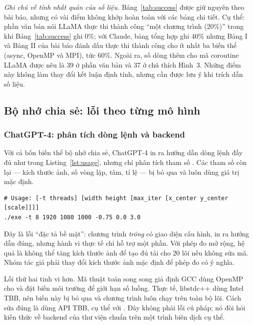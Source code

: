 \noindent\textit{Ghi chú về tính nhất quán của số liệu.} Bảng~\ref{tab:success}
được giữ nguyên theo bài báo, nhưng có vài điểm không khớp hoàn toàn với các bảng
chi tiết. Cụ thể: phần văn bản nói LLaMA thực thi thành công “một chương trình
(20\%)” trong khi Bảng~\ref{tab:success} ghi 0\%; với Claude, bảng tổng hợp ghi
40\% nhưng Bảng I và Bảng II của bài báo đánh dấu thực thi thành công cho ít nhất
ba biến thể (async, OpenMP và MPI), tức 60\%. Ngoài ra, số dòng thêm cho mã
coroutine LLaMA được nêu là 39 ở phần văn bản và 37 ở chú thích Hình~3. Những
điểm này không làm thay đổi kết luận định tính, nhưng cần được lưu ý khi trích
dẫn số liệu.

\subsection{Bộ nhớ chia sẻ: lỗi theo từng mô hình}

\subsubsection{ChatGPT-4: phân tích dòng lệnh và backend}

Với cả bốn biến thể bộ nhớ chia sẻ, ChatGPT-4 in ra hướng dẫn dòng lệnh đầy đủ
như trong Listing~\ref{lst:usage}, nhưng chỉ phân tích tham số . Các
tham số còn lại — kích thước ảnh, số vòng lặp, tâm, tỉ lệ — bị bỏ qua và luôn
dùng giá trị mặc định.

\begin{lstlisting}[language={},caption={Hướng dẫn dòng lệnh do ChatGPT-4 sinh (Listing 1 trong bài báo).},label={lst:usage},numbers=none,basicstyle=\ttfamily\small]
# Usage: [-t threads] [width height [max_iter [x_center y_center [scale]]]]
./exe -t 8 1920 1080 1000 -0.75 0.0 3.0
\end{lstlisting}

Đây là lỗi “đặc tả bề mặt”: chương trình \emph{trông} có giao diện cấu hình, in
ra hướng dẫn đúng, nhưng hành vi thực tế chỉ hỗ trợ một phần. Với phép đo mở rộng,
hệ quả là không thể tăng kích thước ảnh để tạo đủ tải cho 20 lõi nếu không sửa
mã. Nhóm tác giả phải thay đổi kích thước ảnh mặc định để phép đo có ý nghĩa.

Lỗi thứ hai tinh vi hơn. Mã thuật toán song song giả định GCC dùng OpenMP cho
 và đặt biến môi trường  để
giới hạn số luồng. Thực tế, libstdc++ dùng Intel TBB, nên biến này bị bỏ qua và
chương trình luôn chạy trên toàn bộ lõi. Cách sửa đúng là dùng API TBB, cụ thể
 với . Đây không phải
lỗi cú pháp; nó đòi hỏi kiến thức về backend của thư viện chuẩn trên một trình
biên dịch cụ thể.

